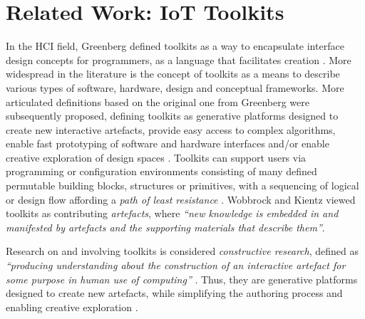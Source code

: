 \chapter[Related Work]{Related Work: IoT Toolkits}
\label{cha:toolkits}


In the HCI field, Greenberg \autocite*{greenberg_toolkits_2007} defined toolkits as a way to encapsulate interface design concepts for programmers, as a language that facilitates creation \autocite{myers_past_2000}. More widespread in the literature is the concept of toolkits as a means to describe various types of software, hardware, design and conceptual frameworks. More articulated definitions based on the original one from Greenberg were subsequently proposed, defining toolkits as generative platforms designed to create new interactive artefacts, provide easy access to complex algorithms, enable fast prototyping of software and hardware interfaces and/or enable creative exploration of design spaces \autocite{ledo_evaluation_2018}. Toolkits can support users via programming or configuration environments consisting of many defined permutable building blocks, structures or primitives, with a sequencing of logical or design flow affording a \textit{path of least resistance} \autocite{ledo_evaluation_2018}. Wobbrock and Kientz \autocite*{wobbrock_research_2016} viewed toolkits as contributing \textit{artefacts}, where \textit{\enquote{new knowledge is embedded in and manifested by artefacts and the supporting materials that describe them}}.

Research on and involving toolkits is considered \textit{constructive research}, defined as \textit{\enquote{producing understanding about the construction of an interactive artefact for some purpose in human use of computing}} \autocite{oulasvirta_hci_2016}. Thus, they are generative platforms designed to create new artefacts, while simplifying the authoring process and enabling creative exploration \autocite{ledo_evaluation_2018}.


